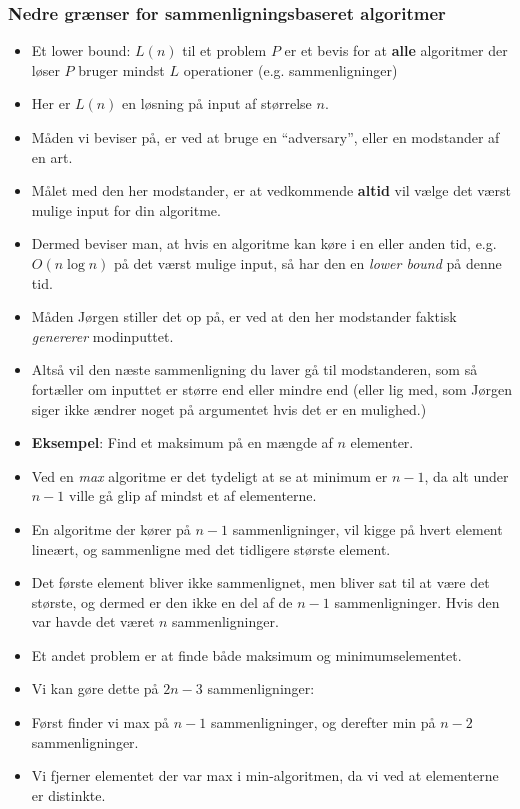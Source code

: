 \begin{frame}[allowframebreaks]
  \frametitle{Nedre grænser for sammenligningsbaseret algoritmer}
\begin{itemize}
  \item Et lower bound: $L(n)$ til et problem $P$ er et bevis for at \textbf{alle} algoritmer der løser $P$ bruger mindst $L$ operationer (e.g. sammenligninger)
  \item Her er $L(n)$ en løsning på input af størrelse $n$.
  \item Måden vi beviser på, er ved at bruge en ``adversary'', eller en modstander af en art.
  \item Målet med den her modstander, er at vedkommende \textbf{altid} vil vælge det værst mulige input for din algoritme.
  \item Dermed beviser man, at hvis en algoritme kan køre i en eller anden tid, e.g. $O(n \log n)$ på det værst mulige input, så har den en \textit{lower bound} på denne tid.
  \item Måden Jørgen stiller det op på, er ved at den her modstander faktisk \textit{genererer} modinputtet.
  \item Altså vil den næste sammenligning du laver gå til modstanderen, som så fortæller om inputtet er større end eller mindre end (eller lig med, som Jørgen siger ikke ændrer noget på argumentet hvis det er en mulighed.)
  \item \textbf{Eksempel}: Find et maksimum på en mængde af $n$ elementer.
  \item Ved en \textit{max} algoritme er det tydeligt at se at minimum er $n-1$, da alt under $n-1$ ville gå glip af mindst et af elementerne.
  \item En algoritme der kører på $n-1$ sammenligninger, vil kigge på hvert element lineært, og sammenligne med det tidligere største element.
  \item Det første element bliver ikke sammenlignet, men bliver sat til at være det største, og dermed er den ikke en del af de $n-1$ sammenligninger. Hvis den var havde det været $n$
sammenligninger.
  \item Et andet problem er at finde både maksimum og minimumselementet.
  \item Vi kan gøre dette på $2n-3$ sammenligninger:
  \item Først finder vi max på $n-1$ sammenligninger, og derefter min på $n-2$ sammenligninger.
  \item Vi fjerner elementet der var max i min-algoritmen, da vi ved at elementerne er distinkte.

\end{itemize}
\end{frame}

